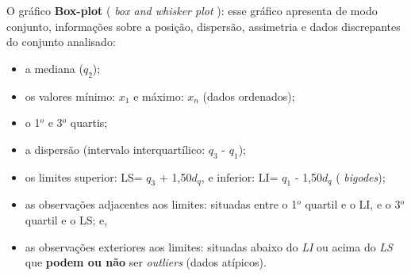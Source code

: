 \documentclass[
]{book}
\providecommand{\tightlist}{%
  \setlength{\itemsep}{0pt}\setlength{\parskip}{0pt}}
\begin{document}
O gráfico \textbf{Box-plot} ( \emph{box and whisker plot} ): esse gráfico apresenta de modo conjunto, informações sobre a posição, dispersão, assimetria e dados discrepantes do conjunto analisado:

\begin{itemize}
\tightlist
\item
  a mediana (\(q_{2}\));
\item
  os valores mínimo: \(x_{1}\) e máximo: \(x_{n}\) (dados ordenados);
\item
  o 1\(^{o}\) e 3\(^{o}\) quartis;
\item
  a dispersão (intervalo interquartílico: \(q_{3}\) - \(q_{1}\));
\item
  os limites superior: LS= \(q_{3}\) + 1,50\(d_{q}\), e inferior: LI= \(q_{1}\) - 1,50\(d_{q}\) ( \emph{bigodes});
\item
  as observações adjacentes aos limites: situadas entre o 1\(^{o}\) quartil e o LI, e o 3\(^{o}\) quartil e o LS; e,
\item
  as observações exteriores aos limites: situadas abaixo do \emph{LI} ou acima do \emph{LS} que \textbf{podem ou não} ser \emph{outliers} (dados atípicos).
\end{itemize}
\end{document}
